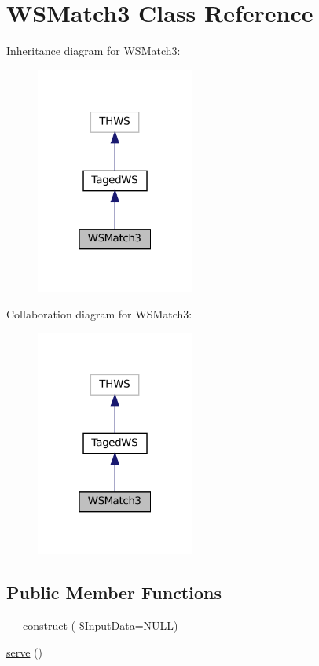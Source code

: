 \hypertarget{class_w_s_match3}{}\section{W\+S\+Match3 Class Reference}
\label{class_w_s_match3}


Inheritance diagram for W\+S\+Match3\+:\nopagebreak
\begin{figure}[H]
\begin{center}
\leavevmode
\includegraphics[width=148pt]{class_w_s_match3__inherit__graph}
\end{center}
\end{figure}


Collaboration diagram for W\+S\+Match3\+:\nopagebreak
\begin{figure}[H]
\begin{center}
\leavevmode
\includegraphics[width=148pt]{class_w_s_match3__coll__graph}
\end{center}
\end{figure}
\subsection*{Public Member Functions}
\begin{DoxyCompactItemize}
\item 
\hyperlink{class_w_s_match3_a5b15159c3ae0bd42ee40cc318b8b27bc}{\+\_\+\+\_\+construct} ( \$Input\+Data=N\+U\+LL)
\item 
\hyperlink{class_w_s_match3_a63e3018032202b5d6f55de7013500aa3}{serve} ()
\end{DoxyCompactItemize}
